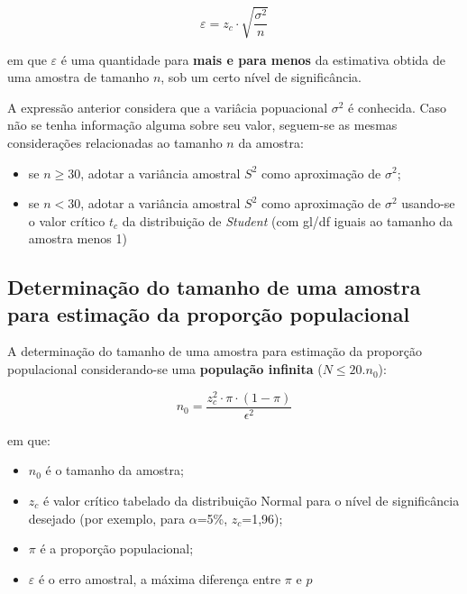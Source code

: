 \documentclass[
]{book}
\providecommand{\tightlist}{%
  \setlength{\itemsep}{0pt}\setlength{\parskip}{0pt}}
\begin{document}
\hfill\break

\[
\varepsilon =  z_{c}\cdot \sqrt{\frac{\sigma^{2}}{n}}
\]

\hfill\break

em que \(\varepsilon\) é uma quantidade para \textbf{mais e para menos} da estimativa obtida de uma amostra de tamanho \(n\), sob um certo nível de significância.

\hfill\break

A expressão anterior considera que a variâcia popuacional \(\sigma^{2}\) é conhecida. Caso não se tenha informação alguma sobre seu valor, seguem-se as mesmas considerações relacionadas ao tamanho \(n\) da amostra:

\hfill\break

\begin{itemize}
\tightlist
\item
  se \(n \ge 30\), adotar a variância amostral \(S^{2}\) como aproximação de \(\sigma^{2}\);\\
\item
  se \(n < 30\), adotar a variância amostral \(S^{2}\) como aproximação de \(\sigma^{2}\) usando-se o valor crítico \(t_{c}\) da distribuição de \emph{Student} (com gl/df iguais ao tamanho da amostra menos 1)
\end{itemize}

\hfill\break

\hypertarget{determinauxe7uxe3o-do-tamanho-de-uma-amostra-para-estimauxe7uxe3o-da-proporuxe7uxe3o-populacional}{%
\subsection{Determinação do tamanho de uma amostra para estimação da proporção populacional}\label{determinauxe7uxe3o-do-tamanho-de-uma-amostra-para-estimauxe7uxe3o-da-proporuxe7uxe3o-populacional}}

\hfill\break

A determinação do tamanho de uma amostra para estimação da proporção populacional considerando-se uma \textbf{população infinita} (\(N \le 20. n_{0}\)):

\hfill\break

\[
n_{0} = \frac{z_{c}^{2} \cdot \pi \cdot (1- \pi) }{\epsilon^{2}}
\]

\hfill\break

em que:

\hfill\break

\begin{itemize}
\tightlist
\item
  \(n_{0}\) é o tamanho da amostra;\\
\item
  \(z_{c}\) é valor crítico tabelado da distribuição Normal para o nível de significância desejado (por exemplo, para \(\alpha\)=5\%, \(z_{c}\)=1,96);\\
\item
  \(\pi\) é a proporção populacional;\\
\item
  \(\varepsilon\) é o erro amostral, a máxima diferença entre \(\pi\) e \(p\)\\
\end{itemize}
\end{document}
